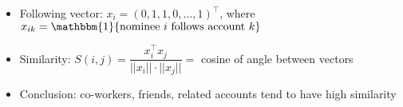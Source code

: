 \documentclass{article}
\begin{document}
	\begin{itemize}
		\item Following vector: $x_i = (0, 1, 1, 0, \ldots, 1)^\top$,
		where $x_{ik} = \mathbbm{1} \{\text{nominee $i$ follows account $k$}\}$
		\item Similarity: $S(i, j) = \dfrac{x_i^\top x_j} {||x_i|| \cdot ||x_j||} = $ cosine of angle between vectors
		\item Conclusion: co-workers, friends, related accounts tend to have high similarity
	\end{itemize}
\end{document}
